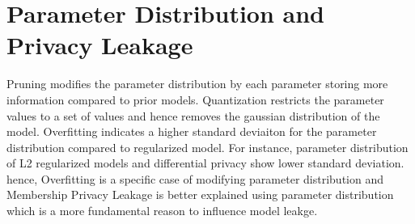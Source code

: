 \section{Parameter Distribution and Privacy Leakage}


Pruning modifies the parameter distribution by each parameter storing more information compared to prior models.
Quantization restricts the parameter values to a set of values and hence removes the gaussian distribution of the model.
Overfitting indicates a higher standard deviaiton for the parameter distribution compared to regularized model.
For instance, parameter distribution of L2 regularized models and differential privacy show lower standard deviation.
hence, Overfitting is a specific case of modifying parameter distribution and Membership Privacy Leakage is better explained using parameter distribution which is a more fundamental reason to influence model leakge.
